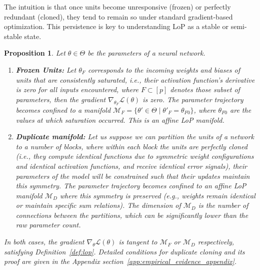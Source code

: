 \documentclass{article}
\newcommand{\Loss}{\mathcal{L}}
\newcommand{\GIU}[1]{\todo[color=purple!30,size=\tiny]{GIU: #1}}
\newtheorem{proposition}{Proposition}[section]
\newtheorem{remark}{Remark}[section]
\numberwithin{figure}{section}
\begin{document}
The intuition is that once units become unresponsive (frozen) or perfectly redundant (cloned), they tend to remain so under standard gradient-based optimization. This persistence is key to understanding LoP as a stable or semi-stable state.
\begin{proposition}
\label{prop:frozen_duplicate_lop}
Let $\theta \in \Theta$ be the parameters of a neural network.
\begin{enumerate}
    \item \textbf{Frozen Units:} Let $\theta_F$ corresponds to the incoming weights and biases of units that are consistently saturated, i.e., their activation function's derivative is zero for all inputs encountered, where $F \subset [p]$ denotes those subset of parameters, then the gradient $\nabla_{\theta_F} \Loss(\theta)$ is zero. The parameter trajectory becomes confined to a manifold $\mathcal{M}_F = \{ \theta' \in \Theta \mid \theta'_F = \theta_{F0} \}$, where $\theta_{F0}$ are the values at which saturation occurred. This is an affine LoP manifold.

    \item \textbf{Duplicate manifold:} Let us suppose we can partition the units of a network to a number of blocks, where within each block the units are perfectly cloned (i.e., they compute identical functions due to symmetric weight configurations and identical activation functions, and receive identical error signals), their  parameters of the model will be constrained such that their updates maintain this symmetry. The parameter trajectory becomes confined to an affine LoP manifold $\mathcal{M}_D$ where this symmetry is preserved (e.g., weights remain identical or maintain specific sum relations). The dimension of $\mathcal{M}_D$ is the number of connections between the partitions, which can be significantly lower than the raw parameter count.
\end{enumerate}
In both cases, the gradient $\nabla_\theta \Loss(\theta)$ is tangent to $\mathcal{M}_F$ or $\mathcal{M}_D$ respectively, satisfying Definition~\ref{def:lop}.
Detailed conditions for duplicate cloning and its proof are given in the Appendix section~\ref{app:empirical_evidence_appendix}. 
\end{proposition}

\end{document}
